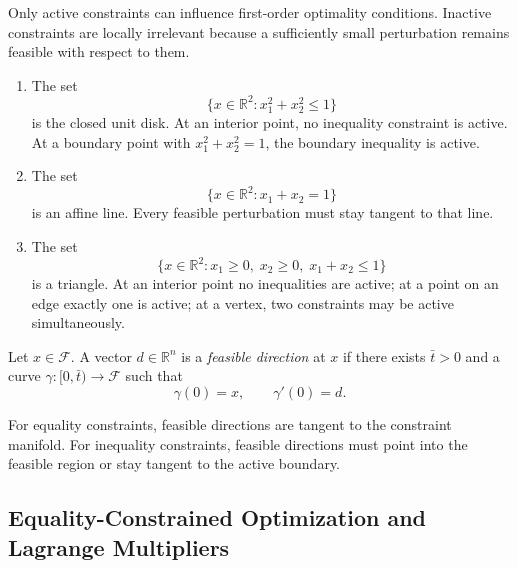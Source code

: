 \begin{remark}
	Only active constraints can influence first-order optimality conditions. Inactive constraints are locally irrelevant because a sufficiently small perturbation remains feasible with respect to them.
\end{remark}

\begin{eg}
	\begin{enumerate}[label=(\alph*)]
		\item The set
		      \[
			      \{x \in \mathbb{R}^2 : x_1^2+x_2^2\le 1\}
		      \]
		      is the closed unit disk. At an interior point, no inequality constraint is active. At a boundary point with $x_1^2+x_2^2=1$, the boundary inequality is active.

		\item The set
		      \[
			      \{x \in \mathbb{R}^2 : x_1+x_2=1\}
		      \]
		      is an affine line. Every feasible perturbation must stay tangent to that line.

		\item The set
		      \[
			      \{x \in \mathbb{R}^2 : x_1\ge 0,\; x_2\ge 0,\; x_1+x_2\le 1\}
		      \]
		      is a triangle. At an interior point no inequalities are active; at a point on an edge exactly one is active; at a vertex, two constraints may be active simultaneously.
	\end{enumerate}
\end{eg}

\begin{definition}\label{def:l3-feasible-direction}
	Let $x \in \mathcal{F}$. A vector $d \in \mathbb{R}^n$ is a \emph{feasible direction} at $x$ if there exists $\bar t>0$ and a curve $\gamma:[0,\bar t)\to \mathcal{F}$ such that
	\[
		\gamma(0)=x,
		\qquad
		\gamma'(0)=d.
	\]
\end{definition}

\begin{remark}
	For equality constraints, feasible directions are tangent to the constraint manifold. For inequality constraints, feasible directions must point into the feasible region or stay tangent to the active boundary.
\end{remark}

\subsection{Equality-Constrained Optimization and Lagrange Multipliers}
\label{sec:l3-equality-constrained-optimization-and-lagrange-multipliers}

